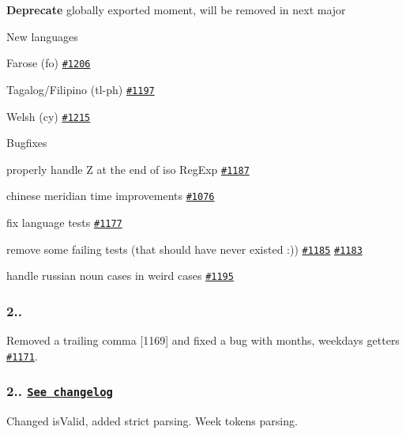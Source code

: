 \begin{DoxyItemize}
\item {\bfseries Deprecate} globally exported moment, will be removed in next major
\item New languages
\begin{DoxyItemize}
\item Farose (fo) \href{https://github.com/moment/moment/issues/1206}{\tt \#1206}
\item Tagalog/\+Filipino (tl-\/ph) \href{https://github.com/moment/moment/issues/1197}{\tt \#1197}
\item Welsh (cy) \href{https://github.com/moment/moment/issues/1215}{\tt \#1215}
\end{DoxyItemize}
\item Bugfixes
\begin{DoxyItemize}
\item properly handle Z at the end of iso Reg\+Exp \href{https://github.com/moment/moment/issues/1187}{\tt \#1187}
\item chinese meridian time improvements \href{https://github.com/moment/moment/issues/1076}{\tt \#1076}
\item fix language tests \href{https://github.com/moment/moment/issues/1177}{\tt \#1177}
\item remove some failing tests (that should have never existed \+:)) \href{https://github.com/moment/moment/issues/1185}{\tt \#1185} \href{https://github.com/moment/moment/issues/1183}{\tt \#1183}
\item handle russian noun cases in weird cases \href{https://github.com/moment/moment/issues/1195}{\tt \#1195}
\end{DoxyItemize}
\end{DoxyItemize}

\subsubsection*{2..}

Removed a trailing comma \mbox{[}1169\mbox{]} and fixed a bug with {\ttfamily months}, {\ttfamily weekdays} getters \href{https://github.com/moment/moment/issues/1171}{\tt \#1171}.

\subsubsection*{2.. \href{https://gist.github.com/ichernev/6864354}{\tt See changelog}}

Changed is\+Valid, added strict parsing. Week tokens parsing.

